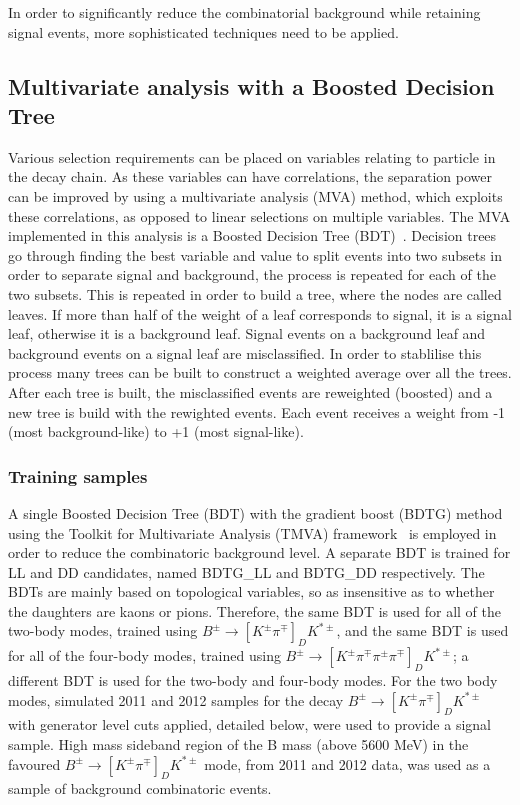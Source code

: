 In order to significantly reduce the combinatorial background while retaining signal events, more sophisticated techniques need to be applied.

\subsection{Multivariate analysis with a Boosted Decision Tree}
\label{sec:selection:bdt}

Various selection requirements can be placed on variables relating to particle in the decay chain. As these variables can have correlations, the separation power can be improved by using a multivariate analysis (MVA) method, which exploits these correlations, as opposed to linear selections on multiple variables. The MVA implemented in this analysis is a Boosted Decision Tree (BDT)~\cite{Breiman}. Decision trees go through finding the best variable and value to split events into two subsets in order to separate signal and background, the process is repeated for each of the two subsets. This is repeated in order to build a tree, where the nodes are called leaves. If more than half of the weight of a leaf corresponds to signal, it is a signal leaf, otherwise it is a background leaf. Signal events on a background leaf and background events on a signal leaf are misclassified. In order to stablilise this process many trees can be built to construct a weighted average over all the trees. After each tree is built, the misclassified events are reweighted (boosted) and a new tree is build with the rewighted events. Each event receives a weight from -1 (most background-like) to +1 (most signal-like). 

\subsubsection{Training samples}

A single Boosted Decision Tree (BDT) with the gradient boost (BDTG) method using the Toolkit for Multivariate Analysis (TMVA) framework~\cite{TMVA} is employed in order to reduce the combinatoric background level. A separate BDT is trained for LL and DD candidates, named BDTG\_LL and BDTG\_DD respectively. The BDTs are mainly based on topological variables, so as insensitive as to whether the \D daughters are kaons or pions. Therefore, the same BDT is used for all of the two-body modes, trained using $B^{\pm} \to [K^{\pm}\pi^{\mp}]_D K^{*\pm}$, and the same BDT is used for all of the four-body modes, trained using $B^{\pm} \to [K^{\pm}\pi^{\mp}\pi^{\pm}\pi^{\mp}]_D K^{*\pm}$; a different BDT is used for the two-body and four-body modes. For the two body modes, simulated 2011 and 2012 samples for the decay $B^{\pm} \to [K^{\pm}\pi^{\mp}]_D K^{*\pm}$ with generator level cuts applied, detailed below, were used to provide a signal sample. High mass sideband region of the B mass (above 5600 MeV) in the favoured $B^{\pm} \to [K^{\pm}\pi^{\mp}]_D K^{*\pm}$ mode, from 2011 and 2012 data, was used as a sample of background combinatoric events. 


